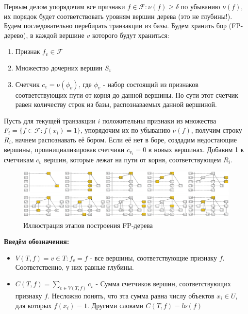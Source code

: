 Первым делом упорядочим все признаки $f \in \mathcal{F}: \nu(f) \geq \delta$ по убыванию $\nu(f)$, их порядок будет соответствовать уровням вершин дерева (это не глубины!). Будем последовательно перебирать транзакции из базы. Будем хранить бор (FP-дерево), в каждой вершине $v$ которого будут храниться:
\begin{enumerate}
    \item Признак $f_v \in \mathcal{F}$
    \item Множество дочерних вершин $S_v$
    \item Счетчик $c_v = \nu(\phi_v)$, где $\phi_v$ - набор состоящий из признаков соответствующих пути от корня до данной вершины. По сути этот счетчик равен количеству строк из базы, распознаваемых данной вершиной.
\end{enumerate}

Пусть для текущей транзакции $i$ положительны признаки из множества $F_i = \{f \in \mathcal{F}: f(x_i) = 1 \}$, упорядочим их по убыванию $\nu(f)$, получим строку $R_i$, начнем распознавать её бором. Если её нет в боре, создадим недостающие вершины, проинициализировав счетчики $c_{v_i} = 0$ в новых вершинах. Добавим 1 к счетчикам $c_v$ вершин, которые лежат на пути от корня, соответствующем $R_i$.

\begin{figure}[h]
    \centering
    \includegraphics[width=1\linewidth]{chapters/rules/images/fp-tree-stages-example.png}
    \caption{Иллюстрация этапов построения FP-дерева}
    \label{fig:enter-label}
\end{figure}

\textbf{Введём обозначения:}

\begin{itemize}
    \item $V(T, f) = {v \in T: f_v = f}$ - все вершины, соответствующие признаку $f$. Соответственно, у них равные глубины.
    \item $C(T, f) = \displaystyle\sum_{v \in V(T, f)} c_v$ - Сумма счетчиков вершин, соответствующих признаку $f$. Несложно понять, что эта сумма равна числу объектов $x_i \in U$, для которых $f(x_i) = 1$. Другими словами $C(T, f) = l\nu(f)$
\end{itemize}


